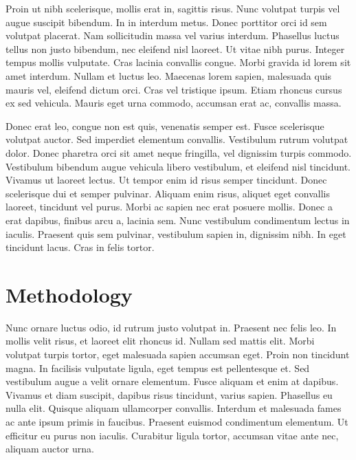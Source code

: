 \documentclass[]{aastex62}
\begin{document}
Proin ut nibh scelerisque, mollis erat in, sagittis risus. Nunc volutpat turpis vel augue suscipit bibendum. In in interdum metus. Donec porttitor orci id sem volutpat placerat. Nam sollicitudin massa vel varius interdum. Phasellus luctus tellus non justo bibendum, nec eleifend nisl laoreet. Ut vitae nibh purus. Integer tempus mollis vulputate. Cras lacinia convallis congue. Morbi gravida id lorem sit amet interdum. Nullam et luctus leo. Maecenas lorem sapien, malesuada quis mauris vel, eleifend dictum orci. Cras vel tristique ipsum. Etiam rhoncus cursus ex sed vehicula. Mauris eget urna commodo, accumsan erat ac, convallis massa.

Donec erat leo, congue non est quis, venenatis semper est. Fusce scelerisque volutpat auctor. Sed imperdiet elementum convallis. Vestibulum rutrum volutpat dolor. Donec pharetra orci sit amet neque fringilla, vel dignissim turpis commodo. Vestibulum bibendum augue vehicula libero vestibulum, et eleifend nisl tincidunt. Vivamus ut laoreet lectus. Ut tempor enim id risus semper tincidunt. Donec scelerisque dui et semper pulvinar. Aliquam enim risus, aliquet eget convallis laoreet, tincidunt vel purus. Morbi ac sapien nec erat posuere mollis. Donec a erat dapibus, finibus arcu a, lacinia sem. Nunc vestibulum condimentum lectus in iaculis. Praesent quis sem pulvinar, vestibulum sapien in, dignissim nibh. In eget tincidunt lacus. Cras in felis tortor.

\section{Methodology} \label{sec:methodology}

Nunc ornare luctus odio, id rutrum justo volutpat in. Praesent nec felis leo. In mollis velit risus, et laoreet elit rhoncus id. Nullam sed mattis elit. Morbi volutpat turpis tortor, eget malesuada sapien accumsan eget. Proin non tincidunt magna. In facilisis vulputate ligula, eget tempus est pellentesque et. Sed vestibulum augue a velit ornare elementum. Fusce aliquam et enim at dapibus. Vivamus et diam suscipit, dapibus risus tincidunt, varius sapien. Phasellus eu nulla elit. Quisque aliquam ullamcorper convallis. Interdum et malesuada fames ac ante ipsum primis in faucibus. Praesent euismod condimentum elementum. Ut efficitur eu purus non iaculis. Curabitur ligula tortor, accumsan vitae ante nec, aliquam auctor urna.
\end{document}
